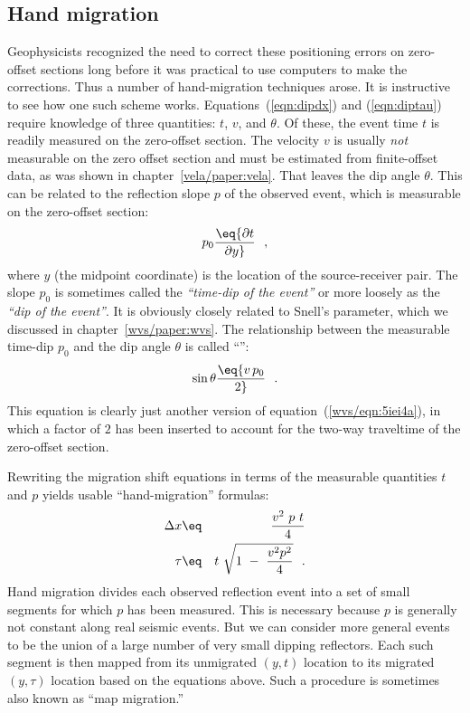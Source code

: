 \subsection{Hand migration}
\par
Geophysicists recognized the need to correct these positioning errors
on zero-offset sections long before it was practical to use computers
to make the corrections.
Thus a number of hand-migration techniques arose.
It is instructive to see how one such scheme works.  
Equations~(\ref{eqn:dipdx}) and (\ref{eqn:diptau}) require knowledge of three quantities:
$t$, $v$, and $\theta$.
Of these, the event time $t$ is readily measured on the zero-offset section.
The velocity $v$ is usually {\em not} measurable on the zero offset section
and must be estimated from finite-offset data,
as was shown in chapter~\ref{vela/paper:vela}.
That leaves the dip angle $\theta$.
This can be related to the reflection slope $p$ of the observed event,
which is measurable on the zero-offset section: 
\begin{equation}
p_0 \eq {\partial t \over \partial y}  \ \ ,
\label{eqn:pdefn}
\end{equation}
where $y$ (the midpoint coordinate) is the location of the 
source-receiver pair.
The slope $p_0$ is sometimes called the {\em ``time-dip of the event''} or 
more loosely 
as the {\em ``dip of the event''}.
It is obviously closely related to Snell's parameter,
which we discussed in chapter~\ref{wvs/paper:wvs}.   
The relationship between the measurable time-dip $p_0$ 
and the dip angle $\theta$ is called
``'':
\begin{equation}
\sin\theta \eq {v\,p_0 \over 2}   \ \ .
\label{eqn:tuchel}
\end{equation}
This equation is clearly just another version
of equation~(\ref{wvs/eqn:5iei4a}),
in which a factor of $2$ has been inserted to account for the 
two-way traveltime
of the zero-offset section.

%

\par
Rewriting the migration shift equations in terms of the measurable
quantities $t$ and $p$ yields usable ``hand-migration'' formulas:
\begin{eqnarray}
\Delta x &\eq& {v^2\ p\ t \over 4}
\label{eqn:laydxp}
\\
\tau &\eq& t\ \sqrt{1\ -\ {v^2 p^2 \over 4} }  \ \  .
\label{eqn:laytaup}
\end{eqnarray}
Hand migration divides each observed reflection event
into a set of small segments for which $p$ has been measured.
This is necessary because $p$ is generally 
not constant along real seismic events.
But we can consider more general
events to be the union of a large number of very small dipping reflectors.
Each such segment is then mapped from its unmigrated $(y,t)$ location
to its migrated $(y,\tau)$ location based on the equations above.  
Such a procedure is sometimes also known as ``map migration.''  

